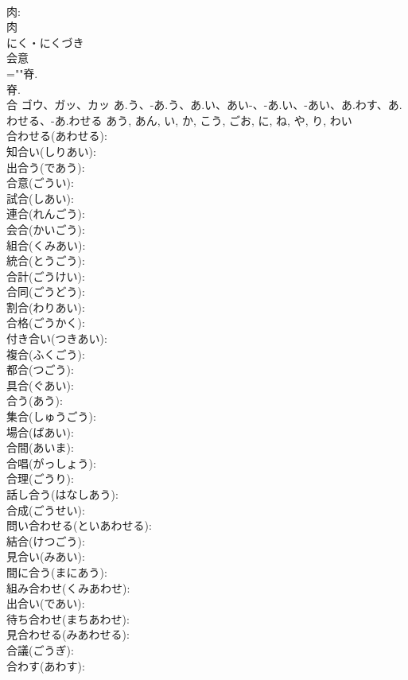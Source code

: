 \documentclass[8pt]{extreport}
\begin{document}
\begin{CJK}{UTF8}{min}
\\	肉: 
\\	肉	
\\	にく・にくづき	
\\	会意 
\\	=""脊.
\\	脊.
\\	合	ゴウ、ガッ、カッ	あ.う、-あ.う、あ.い、あい-、-あ.い、-あい、あ.わす、あ.わせる、-あ.わせる	あう, あん, い, か, こう, ごお, に, ね, や, り, わい	
\\	合わせる(あわせる): 
\\	知合い(しりあい): 
\\	出合う(であう): 
\\	合意(ごうい): 
\\	試合(しあい): 
\\	連合(れんごう): 
\\	会合(かいごう): 
\\	組合(くみあい): 
\\	統合(とうごう): 
\\	合計(ごうけい): 
\\	合同(ごうどう): 
\\	割合(わりあい): 
\\	合格(ごうかく): 
\\	付き合い(つきあい): 
\\	複合(ふくごう): 
\\	都合(つごう): 
\\	具合(ぐあい): 
\\	合う(あう): 
\\	集合(しゅうごう): 
\\	場合(ばあい): 
\\	合間(あいま): 
\\	合唱(がっしょう): 
\\	合理(ごうり): 
\\	話し合う(はなしあう): 
\\	合成(ごうせい): 
\\	問い合わせる(といあわせる): 
\\	結合(けつごう): 
\\	見合い(みあい): 
\\	間に合う(まにあう): 
\\	組み合わせ(くみあわせ): 
\\	出合い(であい): 
\\	待ち合わせ(まちあわせ): 
\\	見合わせる(みあわせる): 
\\	合議(ごうぎ): 
\\	合わす(あわす): 

\end{CJK}
\end{document}

